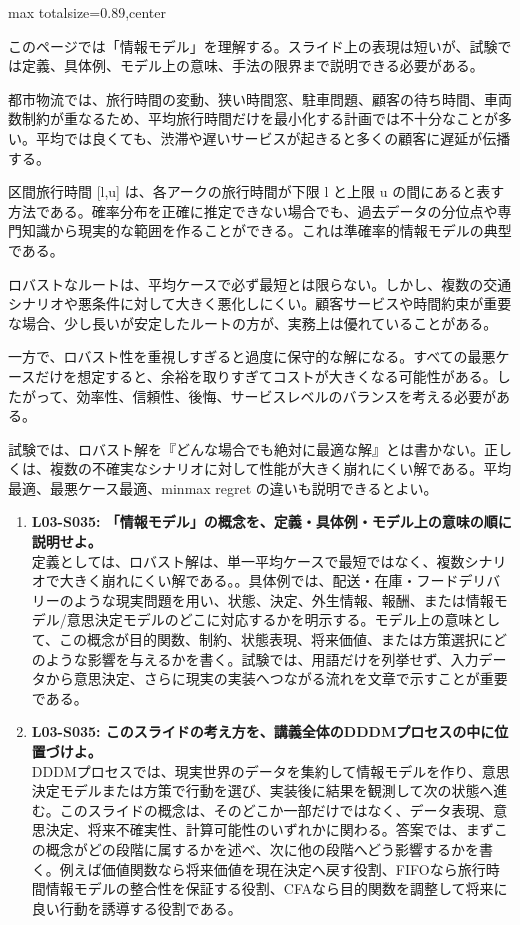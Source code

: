 \begin{minipage}[t]{0.58\textwidth}
\begin{adjustbox}{max totalsize={\textwidth}{0.89\textheight},center}
\begin{minipage}{\textwidth}\scriptsize
{}このページでは「情報モデル」を理解する。スライド上の表現は短いが、試験では定義、具体例、モデル上の意味、手法の限界まで説明できる必要がある。\par
都市物流では、旅行時間の変動、狭い時間窓、駐車問題、顧客の待ち時間、車両数制約が重なるため、平均旅行時間だけを最小化する計画では不十分なことが多い。平均では良くても、渋滞や遅いサービスが起きると多くの顧客に遅延が伝播する。\par
区間旅行時間 [l,u] は、各アークの旅行時間が下限 l と上限 u の間にあると表す方法である。確率分布を正確に推定できない場合でも、過去データの分位点や専門知識から現実的な範囲を作ることができる。これは準確率的情報モデルの典型である。\par
ロバストなルートは、平均ケースで必ず最短とは限らない。しかし、複数の交通シナリオや悪条件に対して大きく悪化しにくい。顧客サービスや時間約束が重要な場合、少し長いが安定したルートの方が、実務上は優れていることがある。\par
一方で、ロバスト性を重視しすぎると過度に保守的な解になる。すべての最悪ケースだけを想定すると、余裕を取りすぎてコストが大きくなる可能性がある。したがって、効率性、信頼性、後悔、サービスレベルのバランスを考える必要がある。\par
試験では、ロバスト解を『どんな場合でも絶対に最適な解』とは書かない。正しくは、複数の不確実なシナリオに対して性能が大きく崩れにくい解である。平均最適、最悪ケース最適、minmax regret の違いも説明できるとよい。\par{}\begin{enumerate}\item \textbf{L03-S035: 「情報モデル」の概念を、定義・具体例・モデル上の意味の順に説明せよ。}\\定義としては、ロバスト解は、単一平均ケースで最短ではなく、複数シナリオで大きく崩れにくい解である。。具体例では、配送・在庫・フードデリバリーのような現実問題を用い、状態、決定、外生情報、報酬、または情報モデル/意思決定モデルのどこに対応するかを明示する。モデル上の意味として、この概念が目的関数、制約、状態表現、将来価値、または方策選択にどのような影響を与えるかを書く。試験では、用語だけを列挙せず、入力データから意思決定、さらに現実の実装へつながる流れを文章で示すことが重要である。\item \textbf{L03-S035: このスライドの考え方を、講義全体のDDDMプロセスの中に位置づけよ。}\\DDDMプロセスでは、現実世界のデータを集約して情報モデルを作り、意思決定モデルまたは方策で行動を選び、実装後に結果を観測して次の状態へ進む。このスライドの概念は、そのどこか一部だけではなく、データ表現、意思決定、将来不確実性、計算可能性のいずれかに関わる。答案では、まずこの概念がどの段階に属するかを述べ、次に他の段階へどう影響するかを書く。例えば価値関数なら将来価値を現在決定へ戻す役割、FIFOなら旅行時間情報モデルの整合性を保証する役割、CFAなら目的関数を調整して将来に良い行動を誘導する役割である。\end{enumerate}

\end{minipage}
\end{adjustbox}
\end{minipage}
